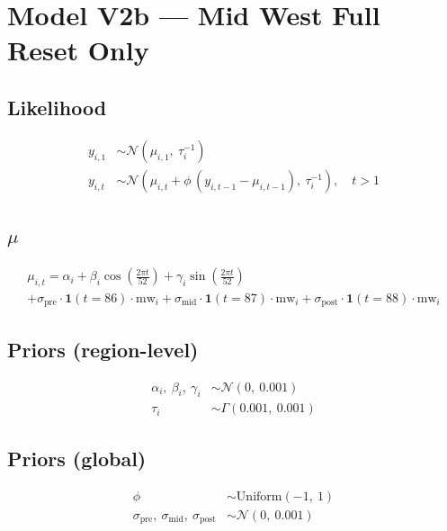\documentclass{article}
\begin{document}
\section*{Model V2b --- Mid West Full Reset Only}

\subsection*{Likelihood}

\begin{align}
  y_{i,1} &\sim \mathcal{N}(\mu_{i,1},\ \tau_i^{-1}) \\[6pt]
  y_{i,t} &\sim \mathcal{N}\left(\mu_{i,t} + \phi\,(y_{i,t-1} - \mu_{i,t-1}),\ \tau_i^{-1}\right), \quad t > 1
\end{align}

\subsection*{$\mu$}

\begin{multline}
  \mu_{i,t} = \alpha_i
    + \beta_i \cos\left(\tfrac{2\pi t}{52}\right)
    + \gamma_i \sin\left(\tfrac{2\pi t}{52}\right) \\
    + \sigma_{\text{pre}} \cdot \mathbf{1}(t = 86) \cdot \mathrm{mw}_i
    + \sigma_{\text{mid}} \cdot \mathbf{1}(t = 87) \cdot \mathrm{mw}_i
    + \sigma_{\text{post}} \cdot \mathbf{1}(t = 88) \cdot \mathrm{mw}_i
\end{multline}

\subsection*{Priors (region-level)}

\begin{align}
  \alpha_i,\ \beta_i,\ \gamma_i &\sim \mathcal{N}(0,\ 0.001) \\
  \tau_i &\sim \Gamma(0.001,\ 0.001)
\end{align}

\subsection*{Priors (global)}

\begin{align}
  \phi &\sim \mathrm{Uniform}(-1,\ 1) \\
  \sigma_{\text{pre}},\ \sigma_{\text{mid}},\ \sigma_{\text{post}} &\sim \mathcal{N}(0,\ 0.001)
\end{align}
\end{document}
